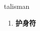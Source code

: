 
\begin{frame}
{\huge talisman}
\begin{center}
\begin{enumerate}\Large
  \item \textbf{护身符}
\end{enumerate}
\end{center}
\end{frame}
